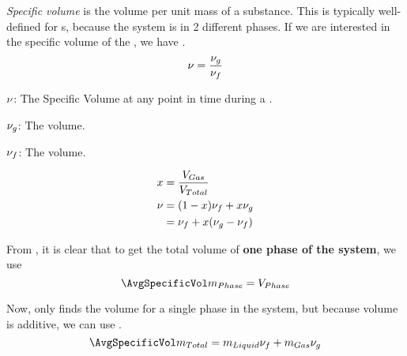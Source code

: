 \begin{definition}\label{def:Specific_Volume}
  \emph{Specific volume} is the volume per unit mass of a substance.
  This is typically well-defined for s, because the system is in 2 different phases.
  If we are interested in the specific volume of the , we have .
  \begin{equation}\label{eq:Specific_Volume}
    \nu = \frac{\nu_{g}}{\nu_{f}}
  \end{equation}

  \begin{description}[noitemsep]
  \item $\nu$: The Specific Volume at any point in time during a .
  \item $\nu_{g}$: The  volume.
  \item $\nu_{f}$: The  volume.
  \end{description}

  \begin{equation}\label{eq:Specific_Volume_Using_Quality}
    \begin{aligned}
      x &= \frac{V_{Gas}}{V_{Total}} \\
      \nu &= (1 - x) \nu_{f} + x \nu_{g} \\
      &= \nu_{f} + x (\nu_{g} - \nu_{f})
    \end{aligned}
  \end{equation}
\end{definition}

From , it is clear that to get the total volume of \textbf{one phase of the system}, we use 
\begin{equation}\label{eq:Single_Phase_Average_Total_Volume}
  \AvgSpecificVol \Mass_{Phase} = \Volume_{Phase}
\end{equation}

Now,  only finds the volume for a single phase in the system, but because volume is additive, we can use .
\begin{equation}\label{eq:Average_Total_Volume}
  \AvgSpecificVol \Mass_{Total} = \Mass_{Liquid} \SaturatedFluidVol + \Mass_{Gas} \SaturatedVaporVol
\end{equation}

